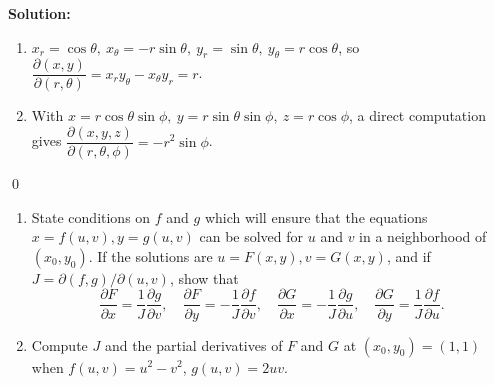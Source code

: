 \bigskip\noindent\textbf{Solution:}
\begin{enumerate}[label=(\alph*)]
    \item $x_r=\cos\theta,\ x_\theta=-r\sin\theta,\ y_r=\sin\theta,\ y_\theta=r\cos\theta$, so
    $\dfrac{\partial(x,y)}{\partial(r,\theta)}=x_r y_\theta-x_\theta y_r=r$.
    \item With $x=r\cos\theta\sin\phi,\ y=r\sin\theta\sin\phi,\ z=r\cos\phi$, a direct computation gives
    $\dfrac{\partial(x,y,z)}{\partial(r,\theta,\phi)}=-r^2\sin\phi$.
\end{enumerate}\qed


\begin{problembox}
\begin{enumerate}[label=(\alph*)]
    \item State conditions on \( f \) and \( g \) which will ensure that the equations \( x = f(u, v), y = g(u, v) \) can be solved for \( u \) and \( v \) in a neighborhood of \( (x_0, y_0) \). If the solutions are \( u = F(x, y), v = G(x, y) \), and if \( J = \partial (f, g)/\partial (u, v) \), show that
    \[\frac{\partial F}{\partial x} = \frac{1}{J} \frac{\partial g}{\partial v}, \quad \frac{\partial F}{\partial y} = -\frac{1}{J} \frac{\partial f}{\partial v}, \quad \frac{\partial G}{\partial x} = -\frac{1}{J} \frac{\partial g}{\partial u}, \quad \frac{\partial G}{\partial y} = \frac{1}{J} \frac{\partial f}{\partial u}.\]
    \item Compute \( J \) and the partial derivatives of \( F \) and \( G \) at \((x_0, y_0) = (1, 1)\) when \( f(u, v) = u^2 - v^2 \), \( g(u, v) = 2uv \).
\end{enumerate}
\end{problembox}

